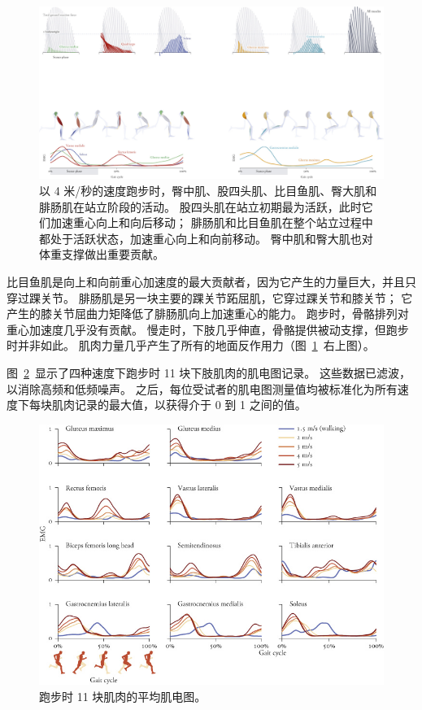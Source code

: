 \begin{figure}[!htb]
	\centering
	\includegraphics[width=1.0\linewidth]{chap12/12_2}
	\caption{以 4 米/秒的速度跑步时，臀中肌、股四头肌、比目鱼肌、臀大肌和腓肠肌在站立阶段的活动。
		股四头肌在站立初期最为活跃，此时它们加速重心向上和向后移动；
		腓肠肌和比目鱼肌在整个站立过程中都处于活跃状态，加速重心向上和向前移动。
		臀中肌和臀大肌也对体重支撑做出重要贡献\cite{hamner2010muscle}。 \label{fig:12_2}}
\end{figure}


比目鱼肌是向上和向前重心加速度的最大贡献者，因为它产生的力量巨大，并且只穿过踝关节。
腓肠肌是另一块主要的踝关节跖屈肌，它穿过踝关节和膝关节；
它产生的膝关节屈曲力矩降低了腓肠肌向上加速重心的能力。
跑步时，骨骼排列对重心加速度几乎没有贡献。
慢走时，下肢几乎伸直，骨骼提供被动支撑，但跑步时并非如此。
肌肉力量几乎产生了所有的地面反作用力（图~\ref{fig:12_2}~右上图）。


图~\ref{fig:12_3}~显示了四种速度下跑步时 11 块下肢肌肉的肌电图记录。
这些数据已滤波，以消除高频和低频噪声。
之后，每位受试者的肌电图测量值均被标准化为所有速度下每块肌肉记录的最大值，以获得介于 0 到 1 之间的值。


\begin{figure}[!htb]
	\centering
	\includegraphics[width=1.0\linewidth]{chap12/12_3}
	\caption{跑步时 11 块肌肉的平均肌电图\cite{arnold2013muscle}。 \label{fig:12_3}}
\end{figure}


